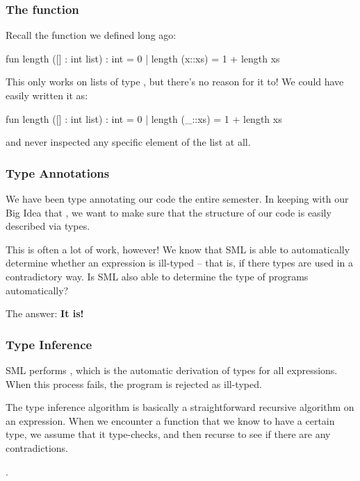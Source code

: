 \documentclass[aspectratio=169]{beamer}
\begin{document}
\begin{frame}[fragile]
  \frametitle{The  function}

  Recall the  function we defined long ago:

  \begin{codeblock}
    fun length ([] : int list) : int = 0 
      | length (x::xs) = 1 + length xs
  \end{codeblock}

  This only works on lists of type , but there's no reason for it
  to! We could have easily written it as:

  \begin{codeblock}
    fun length ([] : int list) : int = 0 
      | length (_::xs) = 1 + length xs
  \end{codeblock}

  and never inspected any specific element of the list at all.
\end{frame}

\begin{frame}[fragile]
  \frametitle{Type Annotations}

  We have been type annotating our code the entire semester. In keeping with
  our Big Idea that , we want to make sure that 
  the structure of our code is easily described via types.
  
  This is often a lot of work, however! We know that SML is able to automatically 
  determine whether an expression is ill-typed -- that is, if there types are 
  used in a contradictory way. Is SML also able to determine the type of programs
  automatically?

  The answer: \textbf{It is!}
\end{frame}

\begin{frame}[fragile]
  \frametitle{Type Inference}

  SML performs , which is the automatic derivation of
  types for all expressions. When this process fails, the program is rejected
  as ill-typed.\footnotemark

  The type inference algorithm is basically a straightforward recursive 
  algorithm on an expression. When we encounter a function that we know to have
  a certain type, we assume that it type-checks, and then recurse to see
  if there are any contradictions. 

  .
\end{frame}
\end{document}
